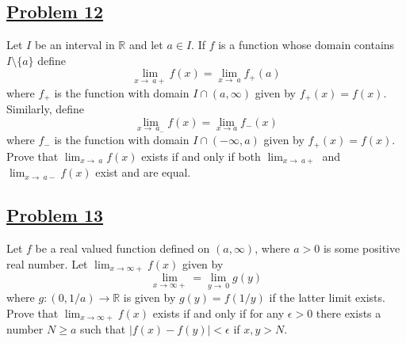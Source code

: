 \documentclass[10pt,letterpaper]{article}
\begin{document}
	\subsection*{{\color{purple}\underline{Problem 12}}}
	Let $I$ be an interval in $\mathbb{R}$ and let $a \in I$. If $f$ is a function whose domain contains
	$I \setminus \{a\}$ define
	$$\displaystyle\lim_{x\to\ a+} f(x) = \displaystyle\lim_{x\to\ a} f_{+}(a)$$
	where $f_{+}$ is the function with domain $I \cap (a, \infty)$ given by $f_{+}(x) = f(x)$. Similarly, 
	define 
	$$\displaystyle\lim_{x\to\ a_{-}}f(x) = \displaystyle\lim_{x\to a}f_{-}(x)$$
	where $f_{-}$ is the function with domain $I \cap (-\infty, a)$ given by $f_{+}(x) = f(x)$. Prove that
	$\displaystyle\lim_{x\to\ a}f(x)$ exists if and only if both $\displaystyle\lim_{x\to\ a+}$ and
	$\displaystyle\lim_{x\to\ a-}f(x)$ exist and are equal.
	
	\subsection*{{\color{purple}\underline{Problem 13}}}
	 Let $f$ be a real valued function defined on $(a, \infty)$, where $a > 0$ is some positive real number.
	 Let $\displaystyle\lim_{x\to\infty+}f(x)$ given by
	 $$\displaystyle\lim_{x\to\infty+} = \displaystyle\lim_{y\to\ 0}g(y)$$
	 where $g: (0, 1/a) \rightarrow \mathbb{R}$ is given by $g(y) = f(1/y)$ if the latter limit exists.
	 Prove that $\displaystyle\lim_{x\to\infty+}f(x)$ exists if and only if for any $\epsilon > 0$ there
	 exists a number $N \geq a$ such that $|f(x) - f(y)| < \epsilon$ if $x, y > N$.
	
\end{document}
